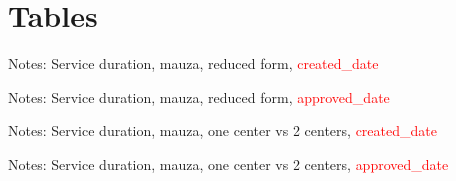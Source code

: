 \documentclass[12pt]{article}
\begin{document}
\newpage
\section{Tables}

\begin{table}[htbp!]
    \begin{center}
    \caption{}
    
    \label{tab:intiqal_1_service_duration_mauza_reduced_3_4}
    \end{center}
    \justifying
Notes: Service duration, mauza, reduced form, \textcolor{red}{created\_date}

\par\vspace{2.5cm}
\end{table}

\begin{table}[htbp!]
    \begin{center}
    \caption{}
    
    \label{tab:intiqal_2_service_duration_mauza_reduced_3_4}
    \end{center}
    \justifying
Notes: Service duration, mauza, reduced form, \textcolor{red}{approved\_date}

\par\vspace{2.5cm}
\end{table}

\begin{table}[htbp!]
    \begin{center}
    \caption{}
    
    \label{tab:intiqal_1_service_duration_mauza_3_4}
    \end{center}
    \justifying
Notes: Service duration, mauza, one center vs 2 centers, \textcolor{red}{created\_date}

\par\vspace{2.5cm}
\end{table}

\begin{table}[htbp!]
    \begin{center}
    \caption{}
    
    \label{tab:intiqal_2_service_duration_mauza_3_4}
    \end{center}
    \justifying
Notes: Service duration, mauza, one center vs 2 centers, \textcolor{red}{approved\_date}

\par\vspace{2.5cm}
\end{table}
\end{document}
